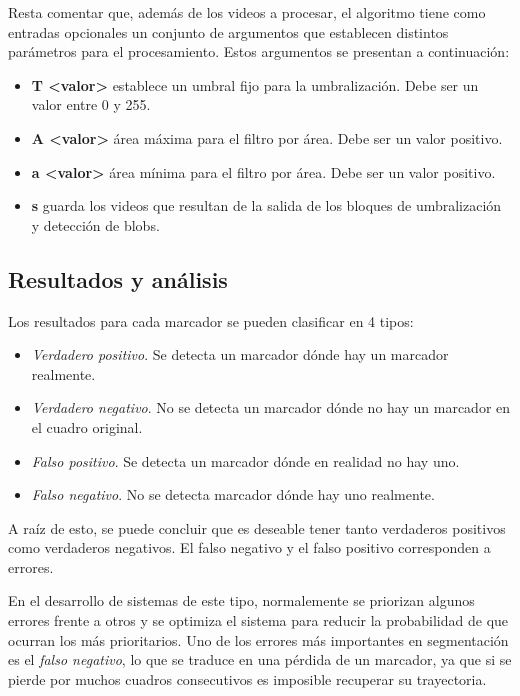  Resta comentar que, además de los videos a procesar, el algoritmo tiene como entradas opcionales un conjunto de argumentos que establecen distintos parámetros para el procesamiento. Estos argumentos se presentan a continuación:

 \begin{itemize}
\item \textbf{T <valor>} establece un umbral fijo para la umbralización. Debe ser un valor entre 0 y 255.
\item \textbf{A <valor>} área máxima para el filtro por área. Debe ser un valor positivo.
\item \textbf{a <valor>} área mínima para el filtro por área. Debe ser un valor positivo.
\item \textbf{s} guarda los videos que resultan de la salida de los bloques de umbralización y detección de blobs.
 \end{itemize}

\subsection{Resultados y análisis}
\label{resultadosyanalisissegmentacion}
Los resultados para cada marcador se pueden clasificar en 4 tipos:
\begin{itemize}
\item \textit{Verdadero positivo}. Se detecta un marcador dónde hay un marcador realmente.
\item \textit{Verdadero negativo}. No se detecta un marcador dónde no hay un marcador en el cuadro original.
\item \textit{Falso positivo}. Se detecta un marcador dónde en realidad no hay uno.
\item \textit{Falso negativo}. No se detecta marcador dónde hay uno realmente.
\end{itemize}


A raíz de esto, se puede concluir que es deseable tener tanto verdaderos positivos como verdaderos negativos. El falso negativo y el falso positivo corresponden a errores. 

En el desarrollo de sistemas de este tipo, normalemente se priorizan algunos errores frente a otros y se optimiza el sistema para reducir la probabilidad de que ocurran los más prioritarios. Uno de los errores más importantes en segmentación es el \textit{falso negativo}, lo que se traduce en una pérdida de un marcador, ya que si se pierde por muchos cuadros consecutivos es imposible recuperar su trayectoria. 


